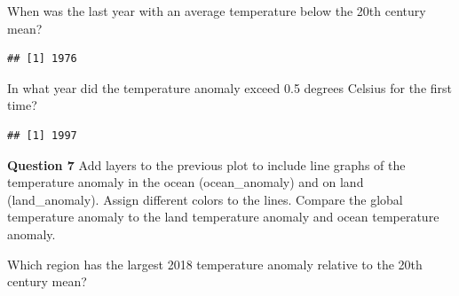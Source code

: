\documentclass[
]{article}
\newenvironment{Shaded}{\begin{snugshade}}{\end{snugshade}}
\newcommand{\DecValTok}[1]{\textcolor[rgb]{0.00,0.00,0.81}{#1}}
\newcommand{\FloatTok}[1]{\textcolor[rgb]{0.00,0.00,0.81}{#1}}
\newcommand{\KeywordTok}[1]{\textcolor[rgb]{0.13,0.29,0.53}{\textbf{#1}}}
\newcommand{\NormalTok}[1]{#1}
\newcommand{\OperatorTok}[1]{\textcolor[rgb]{0.81,0.36,0.00}{\textbf{#1}}}
\newcommand{\StringTok}[1]{\textcolor[rgb]{0.31,0.60,0.02}{#1}}
\begin{document}
When was the last year with an average temperature below the 20th
century mean?

\begin{Shaded}
\end{Shaded}

\begin{verbatim}
## [1] 1976
\end{verbatim}

In what year did the temperature anomaly exceed 0.5 degrees Celsius for
the first time?

\begin{Shaded}
\end{Shaded}

\begin{verbatim}
## [1] 1997
\end{verbatim}

\textbf{Question 7} Add layers to the previous plot to include line
graphs of the temperature anomaly in the ocean (ocean\_anomaly) and on
land (land\_anomaly). Assign different colors to the lines. Compare the
global temperature anomaly to the land temperature anomaly and ocean
temperature anomaly.

Which region has the largest 2018 temperature anomaly relative to the
20th century mean?
\end{document}
